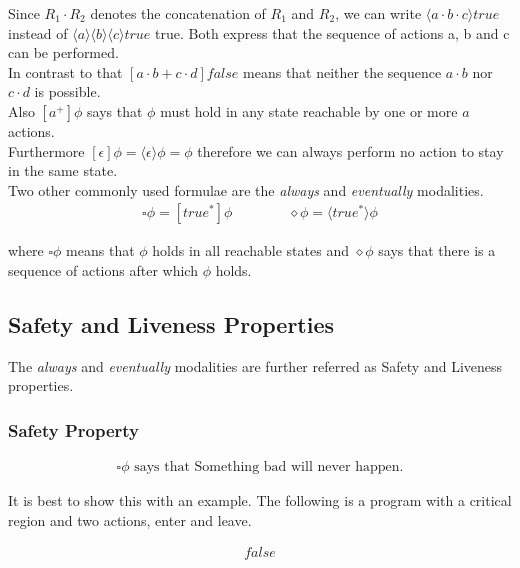 \documentclass{clseminar}
\begin{document}
  Since $R_1\cdot{R_2}$ denotes the concatenation of $R_1$ and $R_2$, we can write $\langle a \cdot b \cdot c \rangle true$ instead of $\langle a \rangle \langle b \rangle \langle c \rangle true$ true. Both express that the sequence of actions a, b and c can be performed. \\
  In contrast to that $[a\cdot{b} + c\cdot{d}]\mathit{false}$ means that neither the sequence $a\cdot{b}$ nor $c\cdot{d}$ is possible. \\
  Also $[a^+]\phi$ says that $\phi$ must hold in any state reachable by one or more $a$ actions. \\
  Furthermore $[\epsilon]\phi = \langle \epsilon \rangle \phi = \phi$ therefore we can always perform no action to stay in the same state. \\

  Two other commonly used formulae are the \textit{always} and \textit{eventually} modalities.\\

  \begin{align*}
    \square\phi = [\mathit{true}^*]\phi \qquad\qquad    \diamond\phi = \langle\mathit{true}^*\rangle\phi
  \end{align*}

  where $\square\phi$ means that $\phi$ holds in all reachable states and $\diamond\phi$ says that there is a sequence of actions after which $\phi$ holds. \\

  \subsection{Safety and Liveness Properties}

  The \textit{always} and \textit{eventually} modalities are further referred as Safety and Liveness properties.

  \subsubsection{Safety Property}

  \begin{align*}
    \square\phi \text{ says that Something bad will never happen.}
  \end{align*}

  It is best to show this with an example. The following is a program with a critical region and two actions, enter and leave.

  \begin{align*}
    [\mathit{true}^*\cdot \mathit{enter} \cdot \overline{\mathit{leave}}^* \cdot \mathit{enter}]\mathit{false}
  \end{align*}
\end{document}
